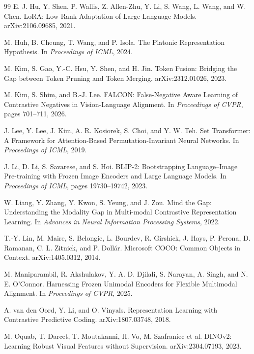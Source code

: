 \documentclass[11pt,a4paper,oneside]{report}
\begin{document}
\begin{thebibliography}{99}
E. J. Hu, Y. Shen, P. Wallis, Z. Allen-Zhu, Y. Li, S. Wang, L. Wang, and
W. Chen.
\newblock LoRA: Low-Rank Adaptation of Large Language Models.
\newblock arXiv:2106.09685, 2021.

M. Huh, B. Cheung, T. Wang, and P. Isola.
\newblock The Platonic Representation Hypothesis.
\newblock In \emph{Proceedings of ICML}, 2024.

M. Kim, S. Gao, Y.-C. Hsu, Y. Shen, and H. Jin.
\newblock Token Fusion: Bridging the Gap between Token Pruning and Token Merging.
\newblock arXiv:2312.01026, 2023.

M. Kim, S. Shim, and B.-J. Lee.
\newblock FALCON: False-Negative Aware Learning of Contrastive Negatives in
Vision-Language Alignment.
\newblock In \emph{Proceedings of CVPR}, pages 701--711, 2026.

J. Lee, Y. Lee, J. Kim, A. R. Kosiorek, S. Choi, and Y. W. Teh.
\newblock Set Transformer: A Framework for Attention-Based
Permutation-Invariant Neural Networks.
\newblock In \emph{Proceedings of ICML}, 2019.

J. Li, D. Li, S. Savarese, and S. Hoi.
\newblock BLIP-2: Bootstrapping Language--Image Pre-training with Frozen Image
Encoders and Large Language Models.
\newblock In \emph{Proceedings of ICML}, pages 19730--19742, 2023.

W. Liang, Y. Zhang, Y. Kwon, S. Yeung, and J. Zou.
\newblock Mind the Gap: Understanding the Modality Gap in Multi-modal
Contrastive Representation Learning.
\newblock In \emph{Advances in Neural Information Processing Systems}, 2022.

T.-Y. Lin, M. Maire, S. Belongie, L. Bourdev, R. Girshick, J. Hays, P. Perona,
D. Ramanan, C. L. Zitnick, and P. Doll\'ar.
\newblock Microsoft COCO: Common Objects in Context.
\newblock arXiv:1405.0312, 2014.

M. Maniparambil, R. Akshulakov, Y. A. D. Djilali, S. Narayan, A. Singh, and
N. E. O'Connor.
\newblock Harnessing Frozen Unimodal Encoders for Flexible Multimodal Alignment.
\newblock In \emph{Proceedings of CVPR}, 2025.

A. van den Oord, Y. Li, and O. Vinyals.
\newblock Representation Learning with Contrastive Predictive Coding.
\newblock arXiv:1807.03748, 2018.

M. Oquab, T. Darcet, T. Moutakanni, H. Vo, M. Szafraniec et al.
\newblock DINOv2: Learning Robust Visual Features without Supervision.
\newblock arXiv:2304.07193, 2023.


\end{thebibliography}
\end{document}

